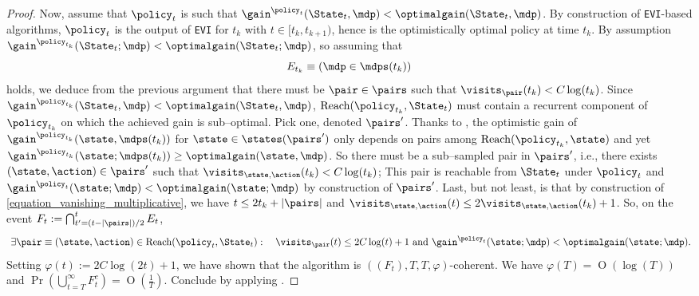 \documentclass[preprint,cleveref,12pt]{colt2025}
\DeclarePairedDelimiter{\abs}{\lvert}{\rvert}	%
\DeclareMathOperator*{\OH}{\mathrm{O}}
\def\model{\mdp}
\def\models{\mdps}
\def\optgain{\optimalgain} %
\def\Reach{\mathrm{Reach}}
\begin{document}
\begin{proof}
        Now, assume that $\policy_t$ is such that $\gain^{\policy_t}(\State_t, \model) < \optgain(\State_t, \model)$. 
        By construction of \texttt{EVI}-based algorithms, $\policy_t$ is the output of \texttt{EVI} for $t_k$ with $t \in [t_k, t_{k+1})$, hence is the optimistically optimal policy at time $t_k$.
        By assumption $\gain^{\policy_{t_k}}(\State_t;\model) < \optgain(\State_t; \model)$, so assuming that 
        \begin{equation}
            E_{t_k} \equiv (\model \in \models(t_k))
        \end{equation}
        holds, we deduce from the previous argument that there must be $\pair \in \pairs$ such that $\visits_\pair(t_k) < C \log(t_k)$. 
        Since $\gain^{\policy_{t_k}}(\State_t, \model) < \optgain(\State_t, \model)$, $\Reach(\policy_{t_k}, \State_t)$ must contain a recurrent component of $\policy_{t_k}$ on which the achieved gain is sub--optimal.
        Pick one, denoted $\pairs'$. 
        Thanks to , the optimistic gain of $\gain^{\policy_{t_k}}(\state, \models(t_k))$ for $\state \in \states(\pairs')$ only depends on pairs among $\Reach(\policy_{t_k}, \state)$ and yet $\gain^{\policy_{t_k}}(\state; \models(t_k)) \ge \optgain(\state, \model)$. 
        So there must be a sub--sampled pair in $\pairs'$, i.e., there exists $(\state, \action) \in \pairs'$ such that $\visits_{\state,\action}(t_k) < C \log(t_k)$; This pair is reachable from $\State_t$ under $\policy_t$ and $\gain^{\policy_t}(\state; \model) < \optgain(\state; \model)$ by construction of $\pairs'$.
        Last, but not least, is that by construction of \eqref{equation_vanishing_multiplicative}, we have $t \le 2t_k + \abs{\pairs}$ and $\visits_{\state,\action}(t) \le 2 \visits_{\state,\action}(t_k) + 1$. 
        So, on the event $F_t := \bigcap_{t'=(t-\abs{\pairs})/2}^t E_t$, 
        \begin{equation}
             \exists \pair \equiv (\state, \action) \in \Reach(\policy_t, \State_t):
            \quad
            \visits_\pair(t) \le 2 C \log(t) + 1
            \text{~and~}
            \gain^{\policy_t}(\state;\model) < \optgain(\state;\model).
        \end{equation}
        Setting $\varphi(t) := 2 C \log(2t) + 1$, we have shown that the algorithm is $((F_t), T, T, \varphi)$-coherent.
        We have $\varphi(T) = \OH(\log(T))$ and $\Pr(\bigcup_{t=T}^\infty F_t^c) = \OH(\frac 1T)$.
        Conclude by applying .
    \end{proof}
\end{document}
